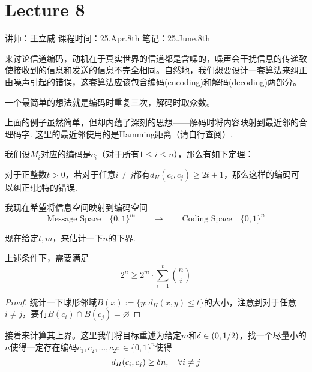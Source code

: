 \chapter{Lecture 8}

\begin{center}
    讲师：王立威 \qquad
    课程时间：25.Apr.8th \qquad 
    笔记：25.June.8th
\end{center}

\bigskip

来讨论信道编码，动机在于真实世界的信道都是含噪的，噪声会干扰信息的传递致使接收到的信息和发送的信息不完全相同。自然地，我们想要设计一套算法来纠正由噪声引起的错误，这套算法应该包含编码(encoding)和解码(decoding)两部分。

\begin{example}
    一个最简单的想法就是编码时重复三次，解码时取众数。
\end{example}

上面的例子虽然简单，但却内蕴了深刻的思想——解码时将内容映射到最近邻的合理码字. 这里的最近邻使用的是Hamming距离（请自行查阅）. 

我们设$M_i$对应的编码是$c_i$（对于所有$1 \le i \le n$），那么有如下定理：
\begin{theorem}
    对于正整数$t > 0$，若对于任意$i\neq j$都有$d_H(c_i,c_j) \ge 2t + 1$，那么这样的编码可以纠正$t$比特的错误. 
\end{theorem}

我现在希望将信息空间映射到编码空间 
\[
\text{Message Space} \quad \{0,1\}^m \quad \quad \longrightarrow \quad \quad
\text{Coding Space} \quad \{0,1\}^n 
\]

现在给定$t,m$，来估计一下$n$的下界. 
\begin{proposition}
    上述条件下，需要满足 
    \[
    2^n \ge 2^m \cdot {\sum_{i=1}^t \binom{n}{i}}
    \]
\end{proposition}
\begin{proof}
统计一下球形邻域$B(x):= \{y:d_H(x,y) \le t\}$的大小，注意到对于任意$i\neq j$，要有$B(c_i)\cap B(c_j) = \varnothing$
\end{proof}

接着来计算其上界。这里我们将目标重述为给定$m$和$ \delta \in (0, 1/2)$，找一个尽量小的$n$使得一定存在编码$c_1, c_2, \dots, c_{2^m} \in \{0,1\}^n$使得
\[
d_H(c_i, c_j) \ge \delta n , \quad \forall i \neq j
\]

